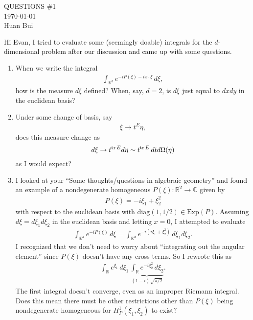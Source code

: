 \documentclass{book}
\theoremstyle{definition}
\begin{document}
\begin{center}
	\huge{QUESTIONS \#1}\\
	$\,$\\
	\normalsize{\today}\\
	\normalsize{Huan Bui}
\end{center}


Hi Evan, I tried to evaluate some (seemingly doable) integrals for the $d$-dimensional problem after our discussion and came up with some questions. 
\begin{enumerate}
	\item When we write the integral 
	\begin{align*}
	\int_{\mathbb{R}^d} e^{-iP(\xi) - ix\cdot \xi}\,d\xi,
	\end{align*}
	how is the measure $d\xi$ defined? When, say, $d=2$, is $d\xi$ just equal to $d x dy$ in the euclidean basis? 
	
	\item Under some change of basis, say
	\begin{align*}
	\xi \to t^E \eta,
	\end{align*}  
	does this measure change as
	\begin{align*}
	d\xi \to t^{\tr E}d\eta \sim t^{\tr E}\,dtd\Omega(\eta)
	\end{align*}
	as I would expect?
	
	\item I looked at your ``Some thoughts/questions in algebraic geometry'' and found an example of a nondegenerate homogeneous $P(\xi): \mathbb{R}^2 \to \mathbb{C}$ given by
	\begin{align*}
	P(\xi) = -i\xi_1 + \xi_2^2
	\end{align*}
	with respect to the euclidean basis with $\text{diag}(1,1/2)\in \text{Exp}(P)$. Assuming $d\xi = d\xi_1d\xi_2$ in the euclidean basis and letting $x = 0$, I attempted to evaluate
	\begin{align*}
	\int_{\mathbb{R}^d} e^{-iP(\xi)}\,d\xi = \int_{\mathbb{R}^d} e^{-i(i\xi_1 + \xi_2^2)}\,d\xi_1d\xi_2.
	\end{align*} 
	I recognized that we don't need to worry about ``integrating out the angular element'' since $P(\xi)$ doesn't have any cross terms. So I rewrote this as
	\begin{align*}
	\int_\mathbb{R}e^{\xi_1}\,d\xi_1\,\underbrace{\int_\mathbb{R}e^{-i\xi_2^2}\,d\xi_2}_{(1-i)\sqrt{\pi/2}}.
	\end{align*}
	The first integral doesn't converge, even as an improper Riemann integral. Does this mean there must be other restrictions other than $P(\xi)$ being nondegenerate homogeneous for $H_P^1(\xi_1,\xi_2)$ to exist?
	

\end{enumerate}
\end{document}

